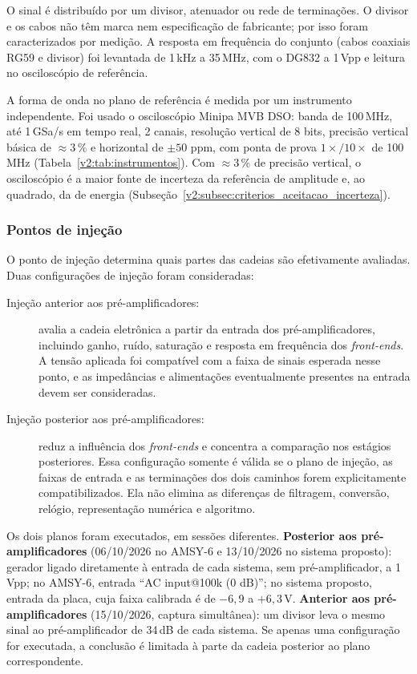 O sinal é distribuído por um divisor, atenuador ou rede de terminações. O divisor e os cabos não têm marca nem especificação de fabricante; por isso foram caracterizados por medição. A resposta em frequência do conjunto (cabos coaxiais RG59 e divisor) foi levantada de 1\,kHz a 35\,MHz, com o DG832 a 1\,Vpp e leitura no osciloscópio de referência.

A forma de onda no plano de referência é medida por um instrumento independente. Foi usado o osciloscópio Minipa MVB DSO: banda de 100\,MHz, até 1\,GSa/s em tempo real, 2 canais, resolução vertical de 8 bits, precisão vertical básica de \(\approx 3\,\%\) e horizontal de \(\pm 50\) ppm, com ponta de prova \(1\times/10\times\) de 100\,MHz (Tabela~\ref{v2:tab:instrumentos}). Com \(\approx 3\,\%\) de precisão vertical, o osciloscópio é a maior fonte de incerteza da referência de amplitude e, ao quadrado, da de energia (Subseção~\ref{v2:subsec:criterios_aceitacao_incerteza}).

\subsubsection{Pontos de injeção}
O ponto de injeção determina quais partes das cadeias são efetivamente avaliadas. Duas configurações de injeção foram consideradas:

\begin{description}
	\item[Injeção anterior aos pré-amplificadores:] avalia a cadeia eletrônica a partir da entrada dos pré-amplificadores, incluindo ganho, ruído, saturação e resposta em frequência dos \textit{front-ends}. A tensão aplicada foi compatível com a faixa de sinais esperada nesse ponto, e as impedâncias e alimentações eventualmente presentes na entrada devem ser consideradas.
	
	\item[Injeção posterior aos pré-amplificadores:] reduz a influência dos \textit{front-ends} e concentra a comparação nos estágios posteriores. Essa configuração somente é válida se o plano de injeção, as faixas de entrada e as terminações dos dois caminhos forem explicitamente compatibilizados. Ela não elimina as diferenças de filtragem, conversão, relógio, representação numérica e algoritmo.
\end{description}

Os dois planos foram executados, em sessões diferentes. \textbf{Posterior aos pré-amplificadores} (06/10/2026 no AMSY-6 e 13/10/2026 no sistema proposto): gerador ligado diretamente à entrada de cada sistema, sem pré-amplificador, a 1\,Vpp; no AMSY-6, entrada ``AC input@100k (0 dB)''; no sistema proposto, entrada da placa, cuja faixa calibrada é de \(-6{,}9\) a \(+6{,}3\,\mathrm{V}\). \textbf{Anterior aos pré-amplificadores} (15/10/2026, captura simultânea): um divisor leva o mesmo sinal ao pré-amplificador de 34\,dB de cada sistema. Se apenas uma configuração for executada, a conclusão é limitada à parte da cadeia posterior ao plano correspondente.


